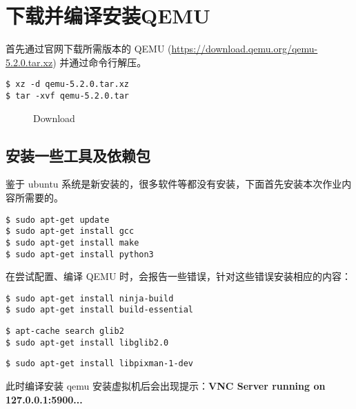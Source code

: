 \documentclass[UTF8,12pt]{ctexart}
\numberwithin{equation}{section}
\begin{document}
\section{下载并编译安装QEMU}
首先通过官网下载所需版本的 QEMU (\url{https://download.qemu.org/qemu-5.2.0.tar.xz}) 并通过命令行解压。
\begin{lstlisting}
$ xz -d qemu-5.2.0.tar.xz
$ tar -xvf qemu-5.2.0.tar
\end{lstlisting}
\begin{figure}[H]
    \centering
    \caption{Download}
\end{figure}
\subsection{安装一些工具及依赖包}
鉴于 ubuntu 系统是新安装的，很多软件等都没有安装，下面首先安装本次作业内容所需要的。
\begin{lstlisting}
$ sudo apt-get update
$ sudo apt-get install gcc
$ sudo apt-get install make
$ sudo apt-get install python3
\end{lstlisting}
在尝试配置、编译 QEMU 时，会报告一些错误，针对这些错误安装相应的内容：

\noindent \textbf{\color[RGB]{255,30,30}{ERROR: Cannot find Ninja}}
\begin{lstlisting}
$ sudo apt-get install ninja-build
$ sudo apt-get install build-essential
\end{lstlisting}
\textbf{\color[RGB]{255,30,30}{ERROR: glib-2.48 gthread-2.0 is required to compile QEMU}}
\begin{lstlisting}
$ apt-cache search glib2
$ sudo apt-get install libglib2.0
\end{lstlisting}
\textbf{\color[RGB]{255,30,30}{Unable to locate package libpixman-1-0-dev}}
\begin{lstlisting}
$ sudo apt-get install libpixman-1-dev
\end{lstlisting}
此时编译安装 qemu 安装虚拟机后会出现提示：\textbf{VNC Server running on 127.0.0.1:5900...}
\end{document}
